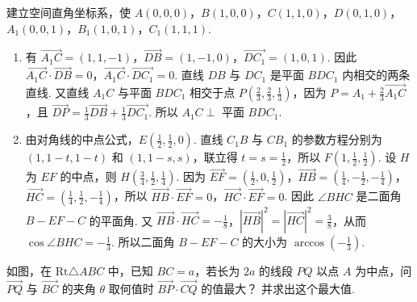 \begin{solution}
建立空间直角坐标系，使 \(A\left(0,0,0\right)\)，\(B\left(1,0,0\right)\)，\(C\left(1,1,0\right)\)，\(D\left(0,1,0\right)\)，\(A_1\left(0,0,1\right)\)，\(B_1\left(1,0,1\right)\)，\(C_1\left(1,1,1\right)\).

\begin{enumerate}
\item 有 \(\overrightarrow{A_1C}=\left(1,1,-1\right)\)，\(\overrightarrow{DB}=\left(1,-1,0\right)\)，\(\overrightarrow{DC_1}=\left(1,0,1\right)\). 因此 \(\overrightarrow{A_1C}\cdot\overrightarrow{DB}=0\)，\(\overrightarrow{A_1C}\cdot\overrightarrow{DC_1}=0\). 直线 \(DB\) 与 \(DC_1\) 是平面 \(BDC_1\) 内相交的两条直线. 又直线 \(A_1C\) 与平面 \(BDC_1\) 相交于点 \(P\left(\frac{2}{3},\frac{2}{3},\frac{1}{3}\right)\)，因为 \(P=A_1+\frac{2}{3}\overrightarrow{A_1C}\)，且 \(\overrightarrow{DP}=\frac{1}{3}\overrightarrow{DB}+\frac{1}{3}\overrightarrow{DC_1}\). 所以 \(A_1C\perp\) 平面 \(BDC_1\).
\item 由对角线的中点公式，\(E\left(\frac{1}{2},\frac{1}{2},0\right)\). 直线 \(C_1B\) 与 \(CB_1\) 的参数方程分别为 \(\left(1,1-t,1-t\right)\) 和 \(\left(1,1-s,s\right)\)，联立得 \(t=s=\frac{1}{2}\)，所以 \(F\left(1,\frac{1}{2},\frac{1}{2}\right)\). 设 \(H\) 为 \(EF\) 的中点，则 \(H\left(\frac{3}{4},\frac{1}{2},\frac{1}{4}\right)\). 因为 \(\overrightarrow{EF}=\left(\frac{1}{2},0,\frac{1}{2}\right)\)，\(\overrightarrow{HB}=\left(\frac{1}{4},-\frac{1}{2},-\frac{1}{4}\right)\)，\(\overrightarrow{HC}=\left(\frac{1}{4},\frac{1}{2},-\frac{1}{4}\right)\)，所以 \(\overrightarrow{HB}\cdot\overrightarrow{EF}=0\)，\(\overrightarrow{HC}\cdot\overrightarrow{EF}=0\). 因此 \(\angle BHC\) 是二面角 \(B-EF-C\) 的平面角. 又 \(\overrightarrow{HB}\cdot\overrightarrow{HC}=-\frac{1}{8}\)，\(|\overrightarrow{HB}|^2=|\overrightarrow{HC}|^2=\frac{3}{8}\)，从而 \(\cos\angle BHC=-\frac{1}{3}\). 所以二面角 \(B-EF-C\) 的大小为 \(\arccos\left(-\frac{1}{3}\right)\).
\end{enumerate}
\end{solution}

\begin{problem}
如图，在 \(\mathrm{Rt}\triangle ABC\) 中，已知 \(BC=a\)，若长为 \(2a\) 的线段 \(PQ\) 以点 \(A\) 为中点，问 \(\overrightarrow{PQ}\) 与 \(\overrightarrow{BC}\) 的夹角 \(\theta\) 取何值时 \(\overrightarrow{BP}\cdot\overrightarrow{CQ}\) 的值最大？ 并求出这个最大值.

\end{problem}

